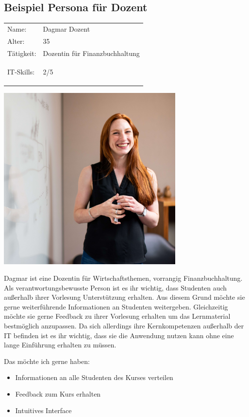 \clearpage
\subsection{Beispiel Persona für Dozent}
\begin{minipage}[t]{0.5\textwidth}
	\vspace{-4cm}
	\renewcommand{\arraystretch}{1.5}
	\begin{tabular}{l l}
		Name: & Dagmar Dozent \\
		Alter: & 35 \\
		Tätigkeit: & Dozentin für Finanzbuchhaltung \\
		IT-Skills: & 2/5 \hspace{-1cm} \begin{barchart}{5.0}
			\baritemNL{}{4}
		\end{barchart} \\
	\end{tabular}
\end{minipage}
\hfill
\begin{minipage}[t]{0.4\textwidth}
	\flushright
	\includegraphics[width=0.70\textwidth]{img/thisisengineering-raeng-TXxiFuQLBKQ-unsplash.jpg}
\end{minipage}

Dagmar ist eine Dozentin für Wirtschaftsthemen, vorrangig Finanzbuchhaltung.
Als verantwortungsbewusste Person ist es ihr wichtig, dass Studenten auch außerhalb ihrer Vorlesung Unterstützung erhalten.
Aus diesem Grund möchte sie gerne weiterführende Informationen an Studenten weitergeben.
Gleichzeitig möchte sie gerne Feedback zu ihrer Vorlesung erhalten um das Lernmaterial bestmöglich anzupassen.
Da sich allerdings ihre Kernkompetenzen außerhalb der IT befinden ist es ihr wichtig, dass sie die Anwendung nutzen kann ohne eine lange Einführung erhalten zu müssen. 


Das möchte ich gerne haben:
\begin{itemize}
	\item Informationen an alle Studenten des Kurses verteilen
    \item Feedback zum Kurs erhalten %
    \item Intuitives Interface
\end{itemize}

